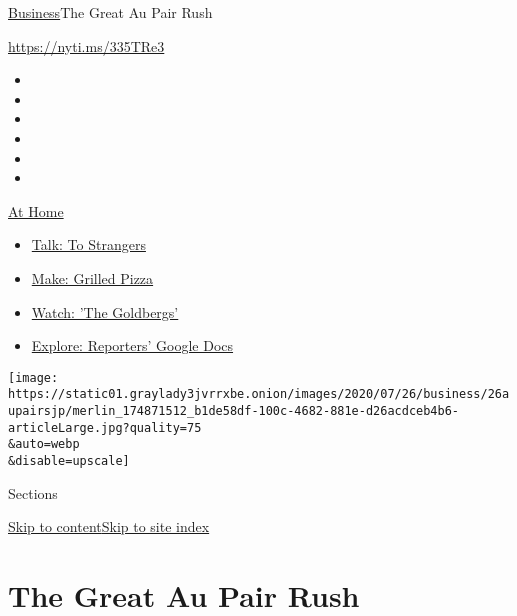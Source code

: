 \href{/section/business}{Business}\textbar{}The Great Au Pair Rush

\href{https://nyti.ms/335TRe3}{https://nyti.ms/335TRe3}

\begin{itemize}
\item
\item
\item
\item
\item
\item
\end{itemize}

\href{https://www.nytimes3xbfgragh.onion/spotlight/at-home?action=click\&pgtype=Article\&state=default\&region=TOP_BANNER\&context=at_home_menu}{At
Home}

\begin{itemize}
\tightlist
\item
  \href{https://www.nytimes3xbfgragh.onion/2020/08/03/well/family/the-benefits-of-talking-to-strangers.html?action=click\&pgtype=Article\&state=default\&region=TOP_BANNER\&context=at_home_menu}{Talk:
  To Strangers}
\item
  \href{https://www.nytimes3xbfgragh.onion/2020/08/01/at-home/coronavirus-make-pizza-on-a-grill.html?action=click\&pgtype=Article\&state=default\&region=TOP_BANNER\&context=at_home_menu}{Make:
  Grilled Pizza}
\item
  \href{https://www.nytimes3xbfgragh.onion/2020/07/31/arts/television/goldbergs-abc-stream.html?action=click\&pgtype=Article\&state=default\&region=TOP_BANNER\&context=at_home_menu}{Watch:
  'The Goldbergs'}
\item
  \href{https://www.nytimes3xbfgragh.onion/interactive/2020/at-home/even-more-reporters-editors-diaries-lists-recommendations.html?action=click\&pgtype=Article\&state=default\&region=TOP_BANNER\&context=at_home_menu}{Explore:
  Reporters' Google Docs}
\end{itemize}

\texttt{[image: https://static01.graylady3jvrrxbe.onion/images/2020/07/26/business/26aupairsjp/merlin\_174871512\_b1de58df-100c-4682-881e-d26acdceb4b6-articleLarge.jpg?quality=75\\\&auto=webp\\\&disable=upscale]}

Sections

\protect\hyperlink{site-content}{Skip to
content}\protect\hyperlink{site-index}{Skip to site index}

\hypertarget{the-great-au-pair-rush}{%
\section{The Great Au Pair Rush}\label{the-great-au-pair-rush}}

